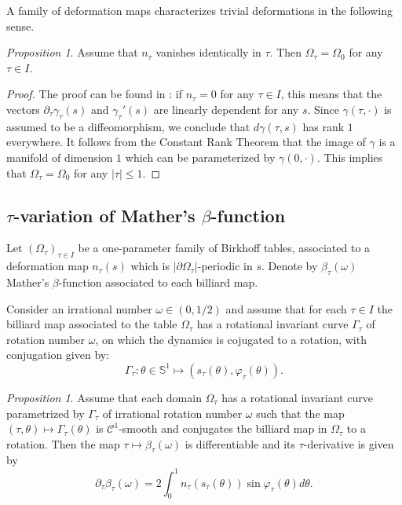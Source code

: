 \documentclass[12pt, openany]{amsart}
\theoremstyle{definition}
\theoremstyle{remark}
\theoremstyle{remark}
\theoremstyle{theorem}
\theoremstyle{theorem}
\theoremstyle{theorem}
\newtheorem{proposition}[theorem]{Proposition}
\theoremstyle{theorem}
\renewcommand{\SS}{\mathbb{S}}
\begin{document}
A family of deformation maps characterizes trivial deformations in the following sense.

\begin{proposition}
\label{proposition:zero_deformation}
Assume that $n_{\tau}$ vanishes identically in $\tau$. Then $\Omega_{\tau}=\Omega_0$ for any $\tau\in I$.
\end{proposition}

\begin{proof}
The proof can be found in \cite[Lemma 3.3]{DKW}: if $n_{\tau}=0$ for any $\tau\in I$, this means that the vectors $\partial_{\tau}\gamma_{\tau}(s)$ and $\gamma_{\tau}'(s)$ are linearly dependent for any $s$. Since $\gamma(\tau,\cdot)$ is assumed to be a diffeomorphism, we conclude that $d\gamma(\tau, s)$ has rank
$1$ everywhere. It follows from the Constant Rank Theorem that the
image of $\gamma$ is a manifold of dimension $1$ which can be parameterized by
$\gamma(0,\cdot)$. This implies that $\Omega_\tau = \Omega_0$ for any $|\tau| \leq 1$.

\end{proof}



\subsection{$\tau$-variation of Mather's $\beta$-function}
\label{subsection:tau_variation_beta}

Let $(\Omega_{\tau})_{\tau\in I}$ be a one-parameter family of Birkhoff tables, associated to a deformation map $n_{\tau}(s)$ which is $|\partial\Omega_{\tau}|$-periodic in $s$. Denote by $\beta_{\tau}(\omega)$ Mather's $\beta$-function associated to each billiard map.

Consider an irrational number $\omega\in (0,1/2)$ and assume that for each $\tau\in I$ the billiard map associated to the table $\Omega_{\tau}$ has a rotational invariant curve $\Gamma_{\tau}$ of rotation number $\omega$, 
on which the dynamics is cojugated to a rotation, with conjugation given by: 
\[
\Gamma_{\tau}:\theta\in\SS^1\mapsto (s_{\tau}(\theta),\varphi_{\tau}(\theta)).
\]
 
 
 \medskip
 
\begin{proposition}
\label{proposition:first_var_beta}
Assume that each domain $\Omega_{\tau}$ has a rotational invariant curve parametrized by $\Gamma_{\tau}$ of irrational rotation number $\omega$ such that the map $(\tau,\theta)\mapsto\Gamma_{\tau}(\theta)$ is $\mathscr C^1$-smooth and conjugates the billiard map in $\Omega_{\tau}$ to a rotation. Then the map $\tau\mapsto\beta_{\tau}(\omega)$ is differentiable and its $\tau$-derivative is given by
\begin{equation}
\label{equation:beta_form1}
\partial_{\tau}\beta_{\tau}(\omega) = 2\int_0^{1}n_{\tau}(s_{\tau}(\theta))\sin\varphi_{\tau}(\theta)d\theta.
\end{equation}
\end{proposition}
\end{document}
